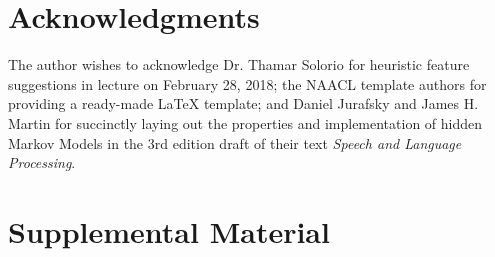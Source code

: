 \documentclass[11pt,a4paper]{article}
\begin{document}
\section*{Acknowledgments}

The author wishes to acknowledge Dr. Thamar Solorio for heuristic feature suggestions in
lecture on February 28, 2018; the NAACL template authors for providing a ready-made
{\LaTeX} template; and Daniel Jurafsky and James H. Martin for succinctly laying out the
properties and implementation of hidden Markov Models in the 3rd edition draft of their
text \emph{Speech and Language Processing}.




\appendix

\section{Supplemental Material}
\label{sec:supplemental}
\end{document}

